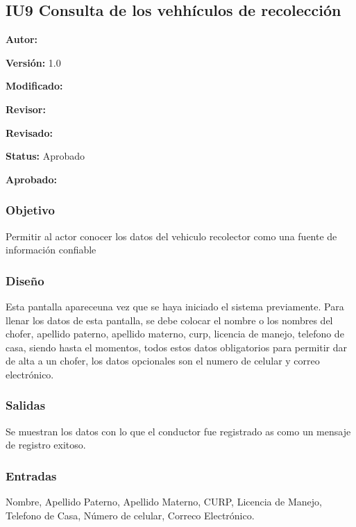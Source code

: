 \subsection{IU9 Consulta de los vehhículos de recolección}

\begin{objetivos}
	\item {\bf Autor:} 
	\item {\bf Versión:} 1.0
	\item {\bf Modificado:} 
	\item {\bf Revisor:} 
	\item {\bf Revisado:}
	\item {\bf Status:} Aprobado
	\item {\bf Aprobado:} 
\end{objetivos}

\subsubsection{Objetivo}

	Permitir al actor conocer los datos del vehiculo recolector como una fuente de información confiable

\subsubsection{Diseño}
	Esta pantalla apareceuna vez que se haya iniciado el sistema previamente.
	Para llenar los datos de esta pantalla, se debe colocar el nombre o los nombres del chofer, apellido paterno, apellido materno,
	curp, licencia de manejo, telefono de casa, siendo hasta el momentos, todos estos datos obligatorios para permitir dar de alta a un chofer, los datos opcionales son el numero de celular y correo electrónico. 


\subsubsection{Salidas}

Se muestran los datos con lo que el conductor fue registrado as como un mensaje de registro exitoso.

\subsubsection{Entradas}
Nombre, Apellido Paterno, Apellido Materno, CURP, Licencia de Manejo, Telefono de Casa, Número de celular, Correco Electrónico.

